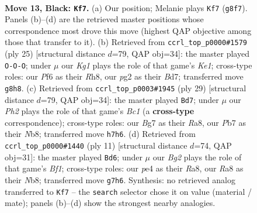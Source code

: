 \documentclass[11pt]{article}
\begin{document}
\clearpage

\begin{figure}[p]\centering
\begin{subfigure}{0.46\textwidth}\centering
\resizebox{\linewidth}{!}{%
\newchessgame
\chessboard[
  setfen={rn3rk1/pppb2bp/5pp1/4p3/2P1P2N/2N1B3/PP3PP1/1R1BK2R b K - 3 13},
  showmover=false,
  pgfstyle=straightmove, color=movearrow, markmove={g8-f7}
]}
\caption{}
\end{subfigure}\hfill
\begin{subfigure}{0.46\textwidth}\centering
\resizebox{\linewidth}{!}{%
\newchessgame
\chessboard[
  setfen={r3k1nr/1p1b1ppp/p2bp3/8/3N4/8/PPP1BPPP/R1BR2K1 b kq - 4 13},
  showmover=false,
  pgfstyle=straightmove, color=movearrow, markmove={e8-c8}
]}
\caption{}
\end{subfigure}
\\[4pt]
\begin{subfigure}{0.46\textwidth}\centering
\resizebox{\linewidth}{!}{%
\newchessgame
\chessboard[
  setfen={rnb1k2r/1p2bppp/p3p3/8/3N2P1/4B3/PPP1BP1P/R3K2R b KQkq - 0 15},
  showmover=false,
  pgfstyle=straightmove, color=movearrow, markmove={c8-d7}
]}
\caption{}
\end{subfigure}\hfill
\begin{subfigure}{0.46\textwidth}\centering
\resizebox{\linewidth}{!}{%
\newchessgame
\chessboard[
  setfen={rnbk1b1r/ppp2ppp/5n2/4p3/4P3/2N2N2/PPP2PPP/R1B1KB1R b KQ - 1 6},
  showmover=false,
  pgfstyle=straightmove, color=movearrow, markmove={f8-d6}
]}
\caption{}
\end{subfigure}
\caption{\textbf{Move 13, Black: \texttt{Kf7}.} (a) Our position; Melanie plays \texttt{Kf7} (\texttt{g8f7}). Panels (b)--(d) are the retrieved master positions whose correspondence most drove this move (highest QAP objective among those that transfer to it). (b) Retrieved from \texttt{ccrl\_top\_p0000\#1579} (ply 25) [structural distance $d$=79, QAP obj=34]: the master played \texttt{O-O-O}; under $\mu$ our \emph{Kg1} plays the role of that game's \emph{Ke1}; cross-type roles: our \emph{P}f6 as their \emph{R}h8, our \emph{p}g2 as their \emph{B}d7; transferred move \texttt{g8h8}. (c) Retrieved from \texttt{ccrl\_top\_p0003\#1945} (ply 29) [structural distance $d$=79, QAP obj=34]: the master played \texttt{Bd7}; under $\mu$ our \emph{Ph2} plays the role of that game's \emph{Bc1} (a \textbf{cross-type} correspondence); cross-type roles: our \emph{B}g7 as their \emph{R}a8, our \emph{P}b7 as their \emph{N}b8; transferred move \texttt{h7h6}. (d) Retrieved from \texttt{ccrl\_top\_p0000\#1440} (ply 11) [structural distance $d$=74, QAP obj=31]: the master played \texttt{Bd6}; under $\mu$ our \emph{Bg2} plays the role of that game's \emph{Bf1}; cross-type roles: our \emph{p}e4 as their \emph{R}a8, our \emph{R}a8 as their \emph{N}b8; transferred move \texttt{g7h6}. Synthesis: no retrieved analog transferred to \texttt{Kf7} -- the \texttt{search} selector chose it on value (material / mate); panels (b)--(d) show the strongest nearby analogies.}
\label{fig:thought-m25}
\end{figure}
\end{document}
